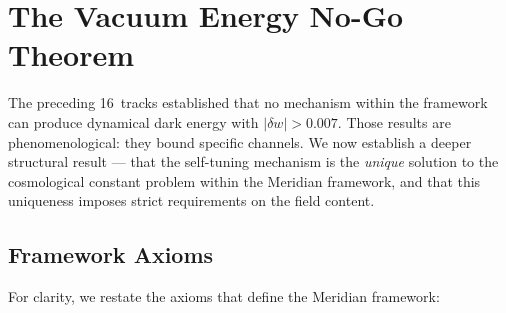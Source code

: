 


\section{The Vacuum Energy No-Go Theorem}
\label{sec:3-vacuum-nogo}

The preceding 16~tracks established that no mechanism within the framework can produce dynamical dark energy with $|\delta w| > 0.007$. Those results are phenomenological: they bound specific channels. We now establish a deeper structural result --- that the self-tuning mechanism is the \emph{unique} solution to the cosmological constant problem within the Meridian framework, and that this uniqueness imposes strict requirements on the field content.

\subsection{Framework Axioms}
\label{sec:3-vnogo-axioms}

For clarity, we restate the axioms that define the Meridian framework:

